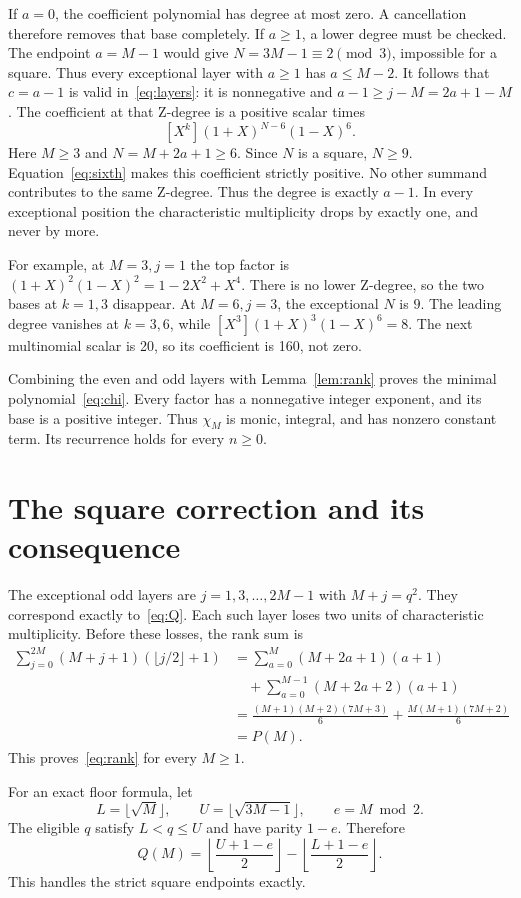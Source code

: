 \documentclass[11pt,a4paper]{article}
\begin{document}
If $a=0$, the coefficient polynomial has degree at most zero. A cancellation
therefore removes that base completely. If $a\ge1$, a lower degree must be
checked. The endpoint $a=M-1$ would give $N=3M-1\equiv2\pmod3$, impossible
for a square. Thus every exceptional layer with $a\ge1$ has $a\le M-2$.
It follows that $c=a-1$ is valid in~\eqref{eq:layers}: it is nonnegative and
$a-1\ge j-M=2a+1-M$.
The coefficient at that Z-degree is a positive scalar times
\[
 [X^k](1+X)^{N-6}(1-X)^6.
\]
Here $M\ge3$ and $N=M+2a+1\ge6$. Since $N$ is a square, $N\ge9$.
Equation~\eqref{eq:sixth} makes this coefficient strictly positive.
No other summand contributes to the same Z-degree. Thus the degree is
exactly $a-1$. In every exceptional position the characteristic multiplicity
drops by exactly one, and never by more.

For example, at $M=3,j=1$ the top factor is
$(1+X)^2(1-X)^2=1-2X^2+X^4$. There is no lower Z-degree, so the two bases
at $k=1,3$ disappear. At $M=6,j=3$, the exceptional $N$ is $9$.
The leading degree vanishes at $k=3,6$, while
$[X^3](1+X)^3(1-X)^6=8$. The next multinomial scalar is 20, so its
coefficient is 160, not zero.

Combining the even and odd layers with Lemma~\ref{lem:rank} proves the
minimal polynomial~\eqref{eq:chi}. Every factor has a nonnegative integer
exponent, and its base is a positive integer. Thus $\chi_M$ is monic,
integral, and has nonzero constant term. Its recurrence holds for every $n\ge0$.

\section{The square correction and its consequence}
The exceptional odd layers are $j=1,3,\ldots,2M-1$ with $M+j=q^2$.
They correspond exactly to~\eqref{eq:Q}. Each such layer loses two units
of characteristic multiplicity.
Before these losses, the rank sum is
\begin{align*}
 \sum_{j=0}^{2M}(M+j+1)(\lfloor j/2\rfloor+1)
 &=\sum_{a=0}^{M}(M+2a+1)(a+1)\\
 &\quad+\sum_{a=0}^{M-1}(M+2a+2)(a+1)\\
 &=\frac{(M+1)(M+2)(7M+3)}6
   +\frac{M(M+1)(7M+2)}6\\
 &=P(M).
\end{align*}
This proves~\eqref{eq:rank} for every $M\ge1$.

For an exact floor formula, let
\[
 L=\lfloor\sqrt M\rfloor,\qquad U=\lfloor\sqrt{3M-1}\rfloor,
 \qquad e=M\bmod2.
\]
The eligible $q$ satisfy $L<q\le U$ and have parity $1-e$. Therefore
\begin{equation}\label{eq:floor}
 Q(M)=\left\lfloor\frac{U+1-e}{2}\right\rfloor
      -\left\lfloor\frac{L+1-e}{2}\right\rfloor.
\end{equation}
This handles the strict square endpoints exactly.
\end{document}

